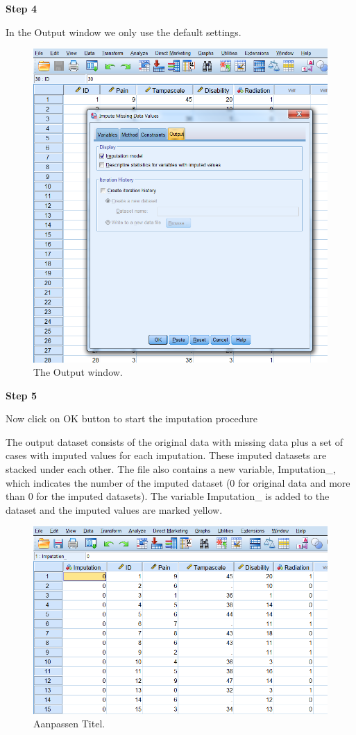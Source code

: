 \documentclass[]{book}
\begin{document}
\textbf{Step 4}

In the Output window we only use the default settings.

\begin{figure}

{\centering \includegraphics[width=0.7\linewidth]{images/fig3.21} 

}

\caption{The Output window.}\label{fig:fig3-21}
\end{figure}

\textbf{Step 5}

Now click on OK button to start the imputation procedure

The output dataset consists of the original data with missing data plus
a set of cases with imputed values for each imputation. These imputed
datasets are stacked under each other. The file also contains a new
variable, Imputation\_, which indicates the number of the imputed
dataset (0 for original data and more than 0 for the imputed datasets).
The variable Imputation\_ is added to the dataset and the imputed values
are marked yellow.

\begin{figure}

{\centering \includegraphics[width=0.7\linewidth]{images/fig3.22} 

}

\caption{Aanpassen Titel.}\label{fig:fig3-22}
\end{figure}
\end{document}
